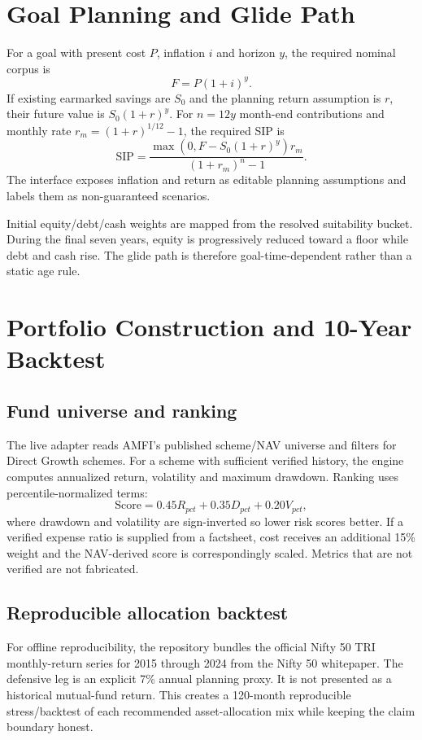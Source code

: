 \documentclass[9pt,a4paper]{article}
\begin{document}
\section{Goal Planning and Glide Path}
For a goal with present cost $P$, inflation $i$ and horizon $y$, the required nominal corpus is
\[
F=P(1+i)^y.
\]
If existing earmarked savings are $S_0$ and the planning return assumption is $r$, their future value is $S_0(1+r)^y$. For $n=12y$ month-end contributions and monthly rate $r_m=(1+r)^{1/12}-1$, the required SIP is
\[
\mathrm{SIP}=\frac{\max(0,F-S_0(1+r)^y)r_m}{(1+r_m)^n-1}.
\]
The interface exposes inflation and return as editable planning assumptions and labels them as non-guaranteed scenarios.

Initial equity/debt/cash weights are mapped from the resolved suitability bucket. During the final seven years, equity is progressively reduced toward a floor while debt and cash rise. The glide path is therefore goal-time-dependent rather than a static age rule.

\section{Portfolio Construction and 10-Year Backtest}
\subsection{Fund universe and ranking}
The live adapter reads AMFI's published scheme/NAV universe and filters for Direct Growth schemes. For a scheme with sufficient verified history, the engine computes annualized return, volatility and maximum drawdown. Ranking uses percentile-normalized terms:
\[
\mathrm{Score}=0.45R_{pct}+0.35D_{pct}+0.20V_{pct},
\]
where drawdown and volatility are sign-inverted so lower risk scores better. If a verified expense ratio is supplied from a factsheet, cost receives an additional 15\% weight and the NAV-derived score is correspondingly scaled. Metrics that are not verified are not fabricated.

\subsection{Reproducible allocation backtest}
For offline reproducibility, the repository bundles the official Nifty 50 TRI monthly-return series for 2015 through 2024 from the Nifty 50 whitepaper. The defensive leg is an explicit 7\% annual planning proxy. It is not presented as a historical mutual-fund return. This creates a 120-month reproducible stress/backtest of each recommended asset-allocation mix while keeping the claim boundary honest.
\end{document}
